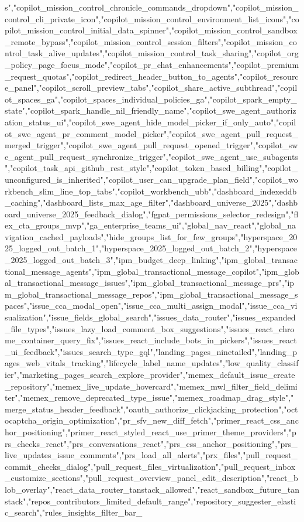 s","copilot_mission_control_chronicle_commands_dropdown","copilot_mission_control_cli_private_icon","copilot_mission_control_environment_list_icons","copilot_mission_control_initial_data_spinner","copilot_mission_control_sandbox_remote_bypass","copilot_mission_control_session_filters","copilot_mission_control_task_alive_updates","copilot_mission_control_task_sharing","copilot_org_policy_page_focus_mode","copilot_pr_chat_enhancements","copilot_premium_request_quotas","copilot_redirect_header_button_to_agents","copilot_resource_panel","copilot_scroll_preview_tabs","copilot_share_active_subthread","copilot_spaces_ga","copilot_spaces_individual_policies_ga","copilot_spark_empty_state","copilot_spark_handle_nil_friendly_name","copilot_swe_agent_authorization_status_ui","copilot_swe_agent_hide_model_picker_if_only_auto","copilot_swe_agent_pr_comment_model_picker","copilot_swe_agent_pull_request_merged_trigger","copilot_swe_agent_pull_request_opened_trigger","copilot_swe_agent_pull_request_synchronize_trigger","copilot_swe_agent_use_subagents","copilot_task_api_github_rest_style","copilot_token_based_billing","copilot_unconfigured_is_inherited","copilot_user_can_upgrade_plan_field","copilot_workbench_slim_line_top_tabs","copilot_workbench_ubb","dashboard_indexeddb_caching","dashboard_lists_max_age_filter","dashboard_universe_2025","dashboard_universe_2025_feedback_dialog","fgpat_permissions_selector_redesign","flex_cta_groups_mvp","ga_enterprise_teams_ui","global_nav_react","global_navigation_cached_payloads","hide_groups_list_for_few_groups","hyperspace_2025_logged_out_batch_1","hyperspace_2025_logged_out_batch_2","hyperspace_2025_logged_out_batch_3","ipm_budget_deep_linking","ipm_global_transactional_message_agents","ipm_global_transactional_message_copilot","ipm_global_transactional_message_issues","ipm_global_transactional_message_prs","ipm_global_transactional_message_repos","ipm_global_transactional_message_spaces","issue_cca_modal_open","issue_cca_multi_assign_modal","issue_cca_visualization","issue_fields_global_search","issues_data_router","issues_expanded_file_types","issues_lazy_load_comment_box_suggestions","issues_react_chrome_container_query_fix","issues_react_include_bots_in_pickers","issues_react_ui_feedback","issues_search_type_gql","landing_pages_ninetailed","landing_pages_web_vitals_tracking","lifecycle_label_name_updates","low_quality_classifier","marketing_pages_search_explore_provider","memex_default_issue_create_repository","memex_live_update_hovercard","memex_mwl_filter_field_delimiter","memex_remove_deprecated_type_issue","memex_roadmap_drag_style","merge_status_header_feedback","oauth_authorize_clickjacking_protection","octocaptcha_origin_optimization","pr_sfv_new_diff_fetch","primer_react_css_anchor_positioning","primer_react_styled_react_use_primer_theme_providers","prs_checks_react","prs_conversations_react","prs_css_anchor_positioning","prs_live_updates_issue_comments","prs_load_all_alerts","prx_files","pull_request_commit_checks_dialog","pull_request_files_virtualization","pull_request_inbox_customize_sections","pull_request_overview_panel_edit_description","react_blob_overlay","react_data_router_tanstack_allowed","react_sandbox_future_tanstack","repos_contributors_limited_default_range","repository_suggester_elastic_search","rules_insights_filter_bar_